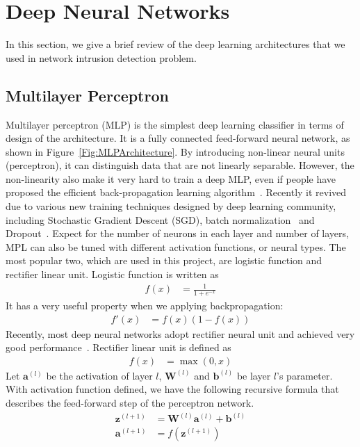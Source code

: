 \section{Deep Neural Networks}
In this section, we give a brief review of the deep learning architectures that we used
in network intrusion detection problem.

\subsection{Multilayer Perceptron}
Multilayer perceptron (MLP) is the simplest deep learning classifier in terms of
design of the architecture.
It is a fully connected feed-forward neural network, as shown in Figure~\ref{Fig:MLPArchitecture}.
By introducing non-linear neural units (perceptron), it can distinguish data that are
not linearly separable.
However, the non-linearity also make it very hard to train a deep MLP,
even if people have proposed the efficient back-propagation learning algorithm~\cite{Backpropagation}.
Recently it revived due to various new training techniques designed by deep learning community,
including Stochastic Gradient Descent (SGD),
batch normalization~\cite{BatchNorm} and Dropout~\cite{Dropout}.
Expect for the number of neurons in each layer and number of layers,
MPL can also be tuned with different activation functions, or neural types.
The most popular two, which are used in this project, are logistic function
and rectifier linear unit.
Logistic function is written as
\begin{align}
    f(x) &= \frac{1}{1 + e^{-x}}
\end{align}
It has a very useful property when we applying backpropagation:
\begin{align}
    f'(x) &= f(x) (1-f(x))
\end{align}
Recently, most deep neural networks adopt rectifier neural unit and achieved very good performance~\cite{DeepLearning}.
Rectifier linear unit is defined as
\begin{align}
    f(x) &= \max(0, x)
\end{align}
Let $\mathbf{a}^{(l)}$ be the activation of layer $l$,
$\mathbf{W}^{(l)}$ and $\mathbf{b}^{(l)}$ be layer $l$'s parameter.
With activation function defined, we have the following recursive formula that describes
the feed-forward step of the perceptron network.
\begin{align}
    \mathbf{z}^{(l+1)} &= \mathbf{W}^{(l)} \mathbf{a}^{(l)} + \mathbf{b}^{(l)} \label{Equ:MLPFeedForward1}\\
    \mathbf{a}^{(l+1)} &= f(\mathbf{z}^{(l+1)})
    \label{Equ:MLPFeedForward2}
\end{align}

